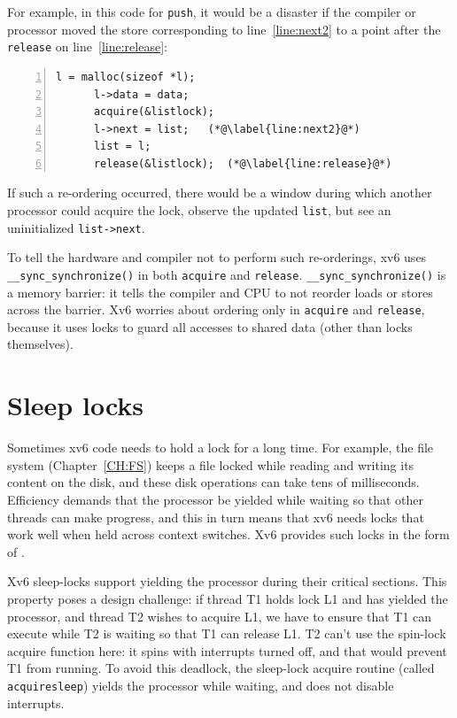 For example, in this code for
\lstinline{push},
it would be a disaster if the compiler or processor moved the
store corresponding to
line~\ref{line:next2} to a point after the
\lstinline{release}
on line~\ref{line:release}:
\begin{lstlisting}[numbers=left,firstnumber=1]
      l = malloc(sizeof *l);
      l->data = data;
      acquire(&listlock);
      l->next = list;   (*@\label{line:next2}@*)
      list = l;      
      release(&listlock);  (*@\label{line:release}@*)
\end{lstlisting}
If such a re-ordering occurred, there would be a window during
which another processor could acquire the lock,
observe the updated
\lstinline{list},
but see an uninitialized
\lstinline{list->next}.

To tell the hardware and compiler not to perform such re-orderings,
xv6 uses
\lstinline{__sync_synchronize()} 
in both
\lstinline{acquire}
and
\lstinline{release}.
\lstinline{__sync_synchronize()}
is a memory barrier:
it tells the compiler and CPU to not reorder loads or stores across the
barrier.
Xv6 worries about ordering only in
\lstinline{acquire}
and
\lstinline{release},
because it uses locks to guard all accesses to shared data (other than locks
themselves).
\section{Sleep locks}

Sometimes xv6 code needs to hold a lock for a long time. For example,
the file system (Chapter~\ref{CH:FS}) keeps a file locked while reading
and writing its content on the disk, and these disk operations can
take tens of milliseconds. Efficiency demands that the processor be
yielded while waiting so that other threads can make
progress, and this in turn means that xv6 needs locks that 
work well when held across context switches.
Xv6 provides such locks in the form of
.

Xv6 sleep-locks support yielding the processor during their critical
sections. This property poses a design challenge: if thread T1 holds
lock L1 and has yielded the processor, and thread T2 wishes to acquire
L1, we have to ensure that T1 can execute while T2 is waiting so
that T1 can release L1. T2 can't use the spin-lock acquire
function here: it
spins with interrupts turned off, and that would prevent T1
from running. To avoid this deadlock, the sleep-lock acquire
routine
(called
\lstinline{acquiresleep})
yields the processor while waiting, and does not disable
interrupts.

